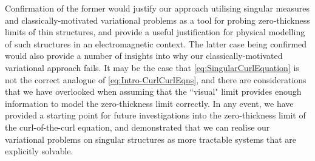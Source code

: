 Confirmation of the former would justify our approach utilising singular measures and classically-motivated variational problems as a tool for probing zero-thickness limits of thin structures, and provide a useful justification for physical modelling of such structures in an electromagnetic context.
The latter case being confirmed would also provide a number of insights into why our classically-motivated variational approach fails.
It may be the case that \eqref{eq:SingularCurlEquation} is not the correct analogue of \eqref{eq:Intro-CurlCurlEqns}, and there are considerations that we have overlooked when assuming that the ``visual" limit provides enough information to model the zero-thickness limit correctly.
In any event, we have provided a starting point for future investigations into the zero-thickness limit of the curl-of-the-curl equation, and demonstrated that we can realise our variational problems on singular structures as more tractable systems that are explicitly solvable.

